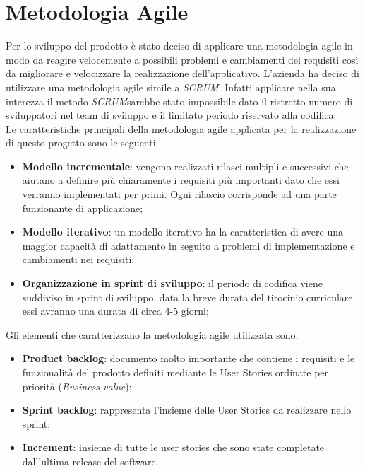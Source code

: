 \section{Metodologia Agile}
Per lo sviluppo del prodotto è stato deciso di applicare una metodologia agile in modo da reagire velocemente a possibili problemi e cambiamenti dei requisiti così da migliorare e velocizzare la realizzazione dell'applicativo. L'azienda ha deciso di utilizzare una metodologia agile simile a \emph{SCRUM}\glo. Infatti applicare nella sua interezza il metodo \emph{SCRUM}\glosp sarebbe stato impossibile dato il ristretto numero di sviluppatori nel team di sviluppo e il limitato periodo riservato alla codifica. \\
Le caratteristiche principali della metodologia agile applicata per la realizzazione di questo progetto sono le seguenti:
\begin{itemize}
	\item \textbf{Modello incrementale}: vengono realizzati rilasci multipli e successivi che aiutano a definire più chiaramente i requisiti più importanti dato che essi verranno implementati per primi. Ogni rilascio corrisponde ad una parte funzionante di applicazione;
	
	\item \textbf{Modello iterativo}: un modello iterativo ha la caratteristica di avere una maggior capacità di adattamento in seguito a problemi di implementazione e cambiamenti nei requisiti;
	
	\item \textbf{Organizzazione in sprint di sviluppo}: il periodo di codifica viene suddiviso in sprint di sviluppo, data la breve durata del tirocinio curriculare essi avranno una durata di circa 4-5 giorni;
\end{itemize}
\noindent
Gli elementi che caratterizzano la metodologia agile utilizzata sono:
\begin{itemize}
	\item \textbf{Product backlog}: documento molto importante che contiene i requisiti e le funzionalità del prodotto definiti mediante le User Stories ordinate per priorità (\emph{Business value});
	
	\item \textbf{Sprint backlog}: rappresenta l'insieme delle User Stories da realizzare nello sprint;
	
	\item \textbf{Increment}: insieme di tutte le user stories che sono state completate dall'ultima release del software.
\end{itemize}
